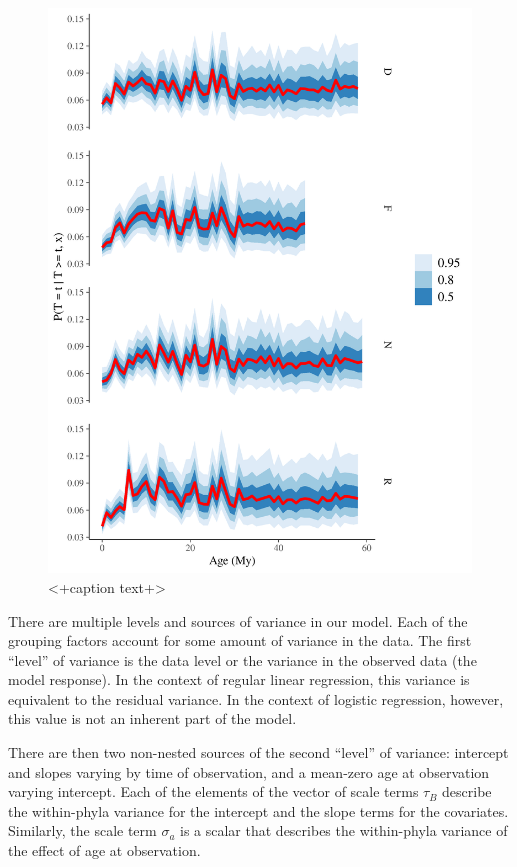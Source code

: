 \documentclass[12pt,letterpaper]{article}
\begin{document}
\begin{figure}[ht]
  \centering
  \includegraphics[width=\textwidth,height=0.5\textheight,keepaspectratio=true]{figure/hazard_bygroup}
  \caption{<+caption text+>}
  \label{fig:hazard_bygroup}
\end{figure}


There are multiple levels and sources of variance in our model. Each of the grouping factors account for some amount of variance in the data. The first ``level'' of variance is the data level or the variance in the observed data (the model response). In the context of regular linear regression, this variance is equivalent to the residual variance. In the context of logistic regression, however, this value is not an inherent part of the model.

There are then two non-nested sources of the second ``level'' of variance: intercept and slopes varying by time of observation, and a mean-zero age at observation varying intercept. Each of the elements of the vector of scale terms \(\tau_{B}\) describe the within-phyla variance for the intercept and the slope terms for the covariates. Similarly, the scale term \(\sigma_{a}\) is a scalar that describes the within-phyla variance of the effect of age at observation. 
\end{document}
